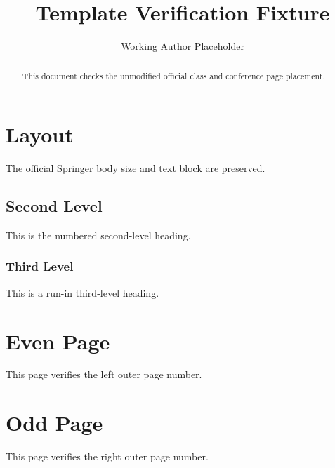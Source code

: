\documentclass[orivec]{llncs}
\begin{document}
\title{Template Verification Fixture}
\author{Working Author Placeholder}
\maketitle
\begin{abstract}This document checks the unmodified official class and conference page placement.\end{abstract}
\section{Layout}
The official Springer body size and text block are preserved.
\subsection{Second Level}
This is the numbered second-level heading.
\subsubsection{Third Level} This is a run-in third-level heading.
\newpage
\section{Even Page}
This page verifies the left outer page number.
\newpage
\section{Odd Page}
This page verifies the right outer page number.
\end{document}
